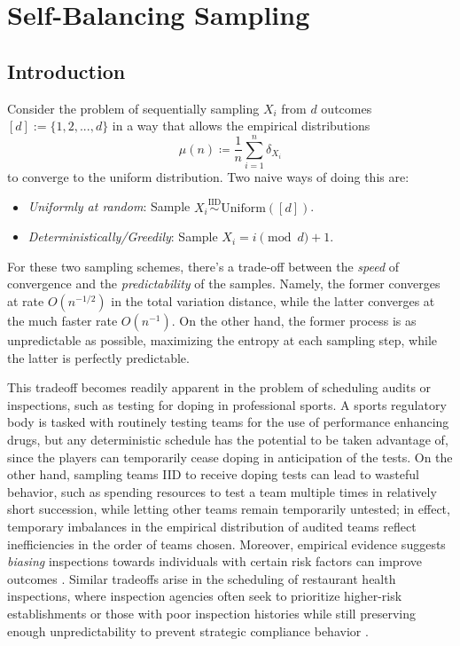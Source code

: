 \chapter{Self-Balancing Sampling}
\setcounter{secnumdepth}{2}

\usetikzlibrary{arrows.meta}
\newcommand{\proofappendixheading}[1]{\bigskip\noindent\textbf{#1}\par\medskip}
\newcommand{\proofappendixstatement}[2]{\noindent\emph{#1.} #2\par\medskip}

\section{Introduction}

Consider the problem of sequentially sampling $X_i$ from $d$ outcomes $[d] := \{1,2,...,d\}$ in a way that allows the empirical distributions
$$\mu(n) \coloneqq \frac{1}{n} \sum_{i=1}^n \delta_{X_i}$$
to converge to the uniform distribution. Two naive ways of doing this are:
\begin{itemize}
    \item \emph{Uniformly at random}: Sample $X_i \overset{\operatorname{IID}}{\sim} \text{Uniform}([d])$.
    \item \emph{Deterministically/Greedily}: Sample $X_i = i \pmod d + 1$.
\end{itemize}

For these two sampling schemes, there's a trade-off between the \emph{speed} of convergence and the \emph{predictability} of the samples. Namely, the former converges at rate $O(n^{-1/2})$ in the total variation distance, while the latter converges at the much faster rate $O(n^{-1})$. On the other hand, the former process is as unpredictable as possible, maximizing the entropy at each sampling step, while the latter is perfectly predictable.

This tradeoff becomes readily apparent in the problem of scheduling audits or 
inspections, such as testing for doping in professional sports. A sports regulatory
 body is tasked with routinely testing teams for the use of performance enhancing drugs, but 
 any deterministic schedule has the potential to be taken advantage of, since the 
 players can temporarily cease doping in anticipation of the tests. On the other hand,
  sampling teams IID to receive doping tests can lead to wasteful behavior, such 
  as spending resources to test a team multiple times in relatively short succession,
   while letting other teams remain temporarily untested; in effect, temporary imbalances 
   in the empirical distribution of audited teams reflect inefficiencies in the order of 
   teams chosen. Moreover, empirical evidence suggests \textit{biasing} inspections towards individuals with certain risk factors can improve outcomes \cite{lauritzen2023_intelligence_based_doping_control}. Similar tradeoffs arise in the scheduling of restaurant health inspections, where inspection agencies often seek to prioritize higher-risk establishments or those with poor inspection histories while still preserving enough unpredictability to prevent strategic compliance behavior \cite{buchholz2002_risk_based_restaurant_inspection}.


